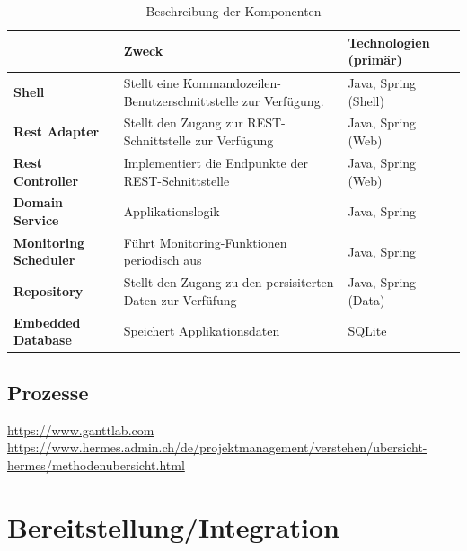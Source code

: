 \documentclass[a4paper,12pt]{report}
\begin{document}
    \begin{table}[h!]
        \centering
        \setlength{\leftmargini}{0.4cm}
        \begin{tabular}{|p{2.5cm}|p{5.5cm}|p{3cm}|}
            \hline
            \textbf                       & \textbf{Zweck}                                                    & \textbf{Technologien (primär)} \\
            \hline
            \textbf{Shell}                & {Stellt eine Kommandozeilen-Benutzerschnittstelle zur Verfügung.} & Java, Spring (Shell)           \\
            \hline
            \textbf{Rest Adapter}         & {Stellt den Zugang zur REST-Schnittstelle zur Verfügung}          & Java, Spring (Web)             \\
            \hline
            \textbf{Rest Controller}      & Implementiert die Endpunkte der REST-Schnittstelle                & Java, Spring (Web)             \\
            \hline
            \textbf{Domain Service}       & Applikationslogik                                                 & Java, Spring                   \\
            \hline
            \textbf{Monitoring Scheduler} & Führt Monitoring-Funktionen periodisch aus                        & Java, Spring                   \\
            \hline
            \textbf{Repository}           & Stellt den Zugang zu den persisiterten Daten zur Verfüfung        & Java, Spring (Data)            \\
            \hline
            \textbf{Embedded Database}    & Speichert Applikationsdaten                                       & SQLite                         \\
            \hline
        \end{tabular}
        \caption{Beschreibung der Komponenten}\label{tab:table3}
    \end{table}

    \clearpage

    \section{Prozesse}
    \url{https://www.ganttlab.com} \\
    \url{https://www.hermes.admin.ch/de/projektmanagement/verstehen/ubersicht-hermes/methodenubersicht.html}


    \chapter{Bereitstellung/Integration}
\end{document}
